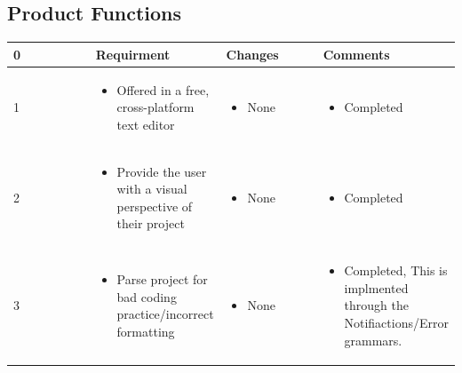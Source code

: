 \documentclass[letterpaper,10pt,titlepage,draftclsnofoot,onecolumn,onesided] {IEEEtran}
\begin{document}
\subsection{Product Functions}
\small{
\begin{center}
	\begin{singlespace}
		\begin{tabular}{ |  p{0.25\linewidth}  |  p{0.25\linewidth}  | p{0.25\linewidth} | p{0.25\linewidth} |}
		\hline
		0 & Requirment & Changes & Comments \\ \hline
		
			1
		& 
			\begin{itemize}
				\item Offered in a free, cross-platform text editor
			\end{itemize}
		& 
			\begin{itemize}
				\item None
			\end{itemize}
		&
			\begin{itemize}
				\item Completed
			\end{itemize} 
		
        \\ \hline

			2
		& 
			\begin{itemize}
				\item Provide the user with a visual perspective of their project
			\end{itemize}
		& 
			\begin{itemize}
				\item None
			\end{itemize}
		&
			\begin{itemize}
				\item Completed
			\end{itemize} 
		
        \\ \hline

            3
		& 
			\begin{itemize}
				\item Parse project for bad coding practice/incorrect formatting
			\end{itemize}
		& 
			\begin{itemize}
				\item None
			\end{itemize}
		&
			\begin{itemize}
				\item Completed, This is implmented through the Notifiactions/Error grammars.
			\end{itemize} 
		

\end{tabular}
\end{singlespace}
\end{center}}
\end{document}
